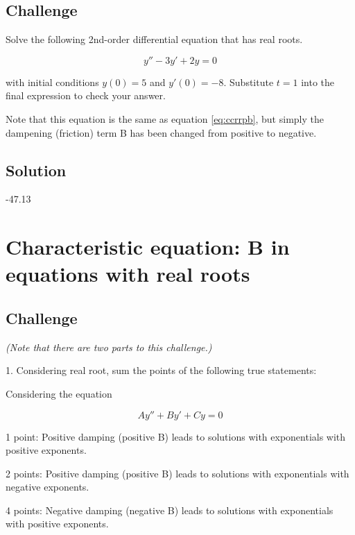 \subsection*{Challenge}
Solve the following 2nd-order differential equation that has real roots. 

\begin{equation}
    y'' - 3 y' + 2 y = 0
\end{equation}

with initial conditions $y(0)=5$ and $y'(0)=-8$. Substitute $t=1$ into the final expression to check your answer.

Note that this equation is the same as equation \ref{eq:ccrrpb}, but simply the dampening (friction) term B has been changed from positive to negative.


\subsection*{Solution}
-47.13 %

\timebox




\newpage
\section{Characteristic equation: B in equations with real roots}

\subsection*{Challenge}

\emph{(Note that there are two parts to this challenge.)}

1. Considering real root, sum the points of the following true statements:

Considering the equation

\begin{equation}
    A y'' + B y' + C y = 0
\end{equation}

1 point: Positive damping (positive B) leads to solutions with exponentials with positive exponents.

2 points: Positive damping (positive B) leads to solutions with exponentials with negative exponents.

4 points: Negative damping (negative B) leads to solutions with exponentials with positive exponents.


